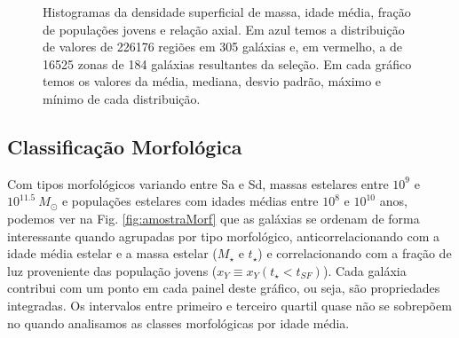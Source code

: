 \begin{figure}
	\centering
	\caption[Histogramas: densidade superficial de massa, idade média, fração de populações jovens e
	relação axial.] 
	{Histogramas da densidade superficial de massa, idade média, fração de populações jovens e relação
axial. Em azul temos a distribuição de valores de 226176 regiões em 305 galáxias e, em vermelho, a
de 16525 zonas de 184 galáxias resultantes da seleção. Em cada gráfico temos os valores da média,
mediana, desvio padrão, máximo e mínimo de cada distribuição.}
	\label{fig:histosample}
\end{figure}

\subsection{Classificação Morfológica}
\label{sec:amostra:morf}

Com tipos morfológicos variando entre Sa e Sd, massas estelares entre $10^9$ e $10^{11.5}\ M_\odot$
e populações estelares com idades médias entre $10^8$ e $10^{10}$ anos, podemos ver na Fig.
\ref{fig:amostraMorf} que as galáxias se ordenam de forma interessante quando agrupadas por tipo
morfológico, anticorrelacionando com a idade média estelar e a massa estelar ($M_\star$ e
$t_\star$) e correlacionando com a fração de luz proveniente das população jovens ($x_Y \equiv x_Y(t_\star <
t_{SF})$). Cada galáxia contribui com um ponto em cada painel deste gráfico, ou seja, são
propriedades integradas. Os intervalos entre primeiro e terceiro quartil quase não se sobrepõem no
quando analisamos as classes morfológicas por idade média. 

